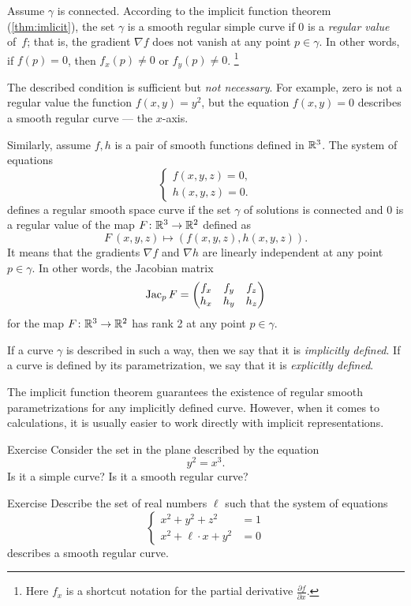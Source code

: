 Assume $\gamma$ is connected.
According to the implicit function theorem (\ref{thm:imlicit}), the set $\gamma$ is a smooth regular simple curve if $0$ is a \emph{regular value} of~$f$; that is, the gradient $\nabla f$ does not vanish at any point $p\in \gamma$.
In other words, if $f(p)=0$, then   
$f_x(p)\ne 0$ or $f_y(p)\ne 0$.%
\footnote{Here $f_x$ is a shortcut notation for the partial derivative
$\tfrac{\partial f}{\partial x}$.}

The described condition is sufficient but {}\emph{not necessary}.
For example, zero is not a regular value the function $f(x,y)=y^2$, but the equation $f(x,y)=0$ describes a smooth regular curve --- the $x$-axis.


Similarly, assume $f,h$ is a pair of smooth functions defined in $\mathbb{R}^3$.
The system of equations
\[\begin{cases}
   f(x,y,z)=0,
   \\
   h(x,y,z)=0.
  \end{cases}
\]
defines a regular smooth space curve if the set $\gamma$ of solutions is connected and $0$ is a regular value of the map $F\colon\mathbb{R}^3\to\mathbb{R}^2$ defined as
\[F\:(x,y,z)\mapsto (f(x,y,z),h(x,y,z)).\]
It means that the gradients $\nabla f$ and $\nabla h$ are linearly independent at any point $p\in \gamma$.
In other words, the Jacobian matrix
\[
\mathop{\rm Jac}\nolimits_pF=\begin{pmatrix}
f_x&f_y&f_z\\
h_x&h_y&h_z
\end{pmatrix}
\]
for the map $F\colon\mathbb{R}^3\to\mathbb{R}^2$ has rank 2 at any point $p \in \gamma$.

If a curve $\gamma$ is described in such a way,
then we say that it is \emph{implicitly defined}.
If a curve is defined by its parametrization, we say that it is \emph{explicitly defined}.

The implicit function theorem guarantees the existence of regular smooth parametrizations for any implicitly defined curve.
However, when it comes to calculations, it is usually easier to work directly with implicit representations. 

\begin{thm}{Exercise}\label{ex:y^2=x^3}
Consider the set in the plane described by the equation
\[y^2=x^3.\]
Is it a simple curve?
Is it a smooth regular curve?
\end{thm}

\begin{thm}{Exercise}\label{ex:viviani}
Describe the set of real numbers $\ell$
such that the system of equations
\[\begin{cases}
x^2+y^2+z^2&=1
\\
x^2+\ell\cdot x+y^2&=0
\end{cases}\]
describes a smooth regular curve.
\end{thm}

